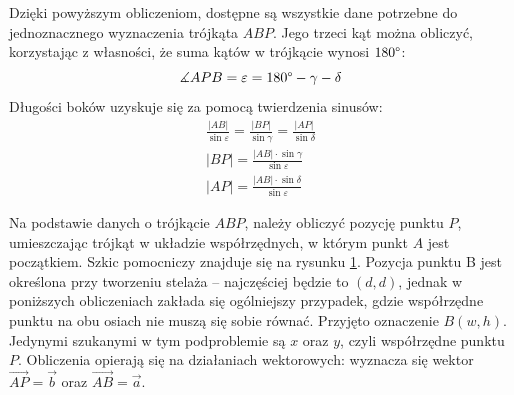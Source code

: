 Dzięki powyższym obliczeniom, dostępne są wszystkie dane potrzebne do jednoznacznego wyznaczenia trójkąta $ABP$. Jego trzeci kąt można obliczyć, korzystając z własności, że suma kątów w trójkącie wynosi $180\degree$:
$$
\measuredangle APB = \varepsilon = 180\degree - \gamma - \delta
$$
Długości boków uzyskuje się za pomocą twierdzenia sinusów:
\begin{gather*}
\frac{|AB|}{\sin\varepsilon} = \frac{|BP|}{\sin\gamma} = \frac{|AP|}{\sin\delta} \\[1em]
|BP| = \frac{|AB| \cdot \sin\gamma}{\sin\varepsilon} \\[1em]
|AP| = \frac{|AB| \cdot \sin\delta}{\sin\varepsilon}
\end{gather*}

Na podstawie danych o trójkącie $ABP$, należy obliczyć pozycję punktu $P$, umieszczając trójkąt w układzie współrzędnych, w którym punkt $A$ jest początkiem. Szkic pomocniczy znajduje się na rysunku \ref{trojkat_kartezjanskie}. Pozycja punktu B jest określona przy tworzeniu stelaża -- najczęściej będzie to $(d, d)$, jednak w poniższych obliczeniach zakłada się ogólniejszy przypadek, gdzie współrzędne punktu na obu osiach nie muszą się sobie równać. Przyjęto oznaczenie $B(w, h)$. Jedynymi szukanymi w tym podproblemie są $x$ oraz $y$, czyli współrzędne punktu $P$. Obliczenia opierają się na działaniach wektorowych: wyznacza się wektor $\overrightarrow{AP} = \overrightarrow{b}$ oraz $\overrightarrow{AB} = \overrightarrow{a}$.

\begin{figure}[h!]
\begin{center}

\end{center}
\label{trojkat_kartezjanskie}
\end{figure} 

